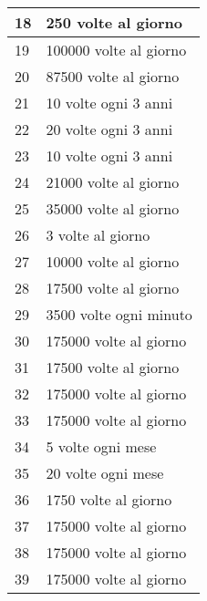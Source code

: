 \begin{table}[H]
{\begin{tabular}{ll}
\multicolumn{1}{|l|}{18} & \multicolumn{1}{l|}{250 volte al giorno}     \\ \hline
\multicolumn{1}{|l|}{19} & \multicolumn{1}{l|}{100000 volte al giorno}  \\ \hline
\multicolumn{1}{|l|}{20} & \multicolumn{1}{l|}{87500 volte al giorno}   \\ \hline
\multicolumn{1}{|l|}{21} & \multicolumn{1}{l|}{10 volte ogni 3 anni}    \\ \hline
\multicolumn{1}{|l|}{22} & \multicolumn{1}{l|}{20 volte ogni 3 anni}    \\ \hline
\multicolumn{1}{|l|}{23} & \multicolumn{1}{l|}{10 volte ogni 3 anni}    \\ \hline
\multicolumn{1}{|l|}{24} & \multicolumn{1}{l|}{21000 volte al giorno}   \\ \hline
\multicolumn{1}{|l|}{25} & \multicolumn{1}{l|}{35000 volte al giorno}   \\ \hline
\multicolumn{1}{|l|}{26} & \multicolumn{1}{l|}{3 volte al giorno}       \\ \hline
\multicolumn{1}{|l|}{27} & \multicolumn{1}{l|}{10000 volte al giorno}   \\ \hline
\multicolumn{1}{|l|}{28} & \multicolumn{1}{l|}{17500 volte al giorno}   \\ \hline
\multicolumn{1}{|l|}{29} & \multicolumn{1}{l|}{3500 volte ogni minuto}  \\ \hline
\multicolumn{1}{|l|}{30} & \multicolumn{1}{l|}{175000 volte al giorno}  \\ \hline
\multicolumn{1}{|l|}{31} & \multicolumn{1}{l|}{17500 volte al giorno}   \\ \hline
\multicolumn{1}{|l|}{32} & \multicolumn{1}{l|}{175000 volte al giorno}  \\ \hline
\multicolumn{1}{|l|}{33} & \multicolumn{1}{l|}{175000 volte al giorno}  \\ \hline
\multicolumn{1}{|l|}{34} & \multicolumn{1}{l|}{5 volte ogni mese}       \\ \hline
\multicolumn{1}{|l|}{35} & \multicolumn{1}{l|}{20 volte ogni mese}      \\ \hline
\multicolumn{1}{|l|}{36} & \multicolumn{1}{l|}{1750 volte al giorno}    \\ \hline
\multicolumn{1}{|l|}{37} & \multicolumn{1}{l|}{175000 volte al giorno}  \\ \hline
\multicolumn{1}{|l|}{38} & \multicolumn{1}{l|}{175000 volte al giorno}  \\ \hline
\multicolumn{1}{|l|}{39} & \multicolumn{1}{l|}{175000 volte al giorno}  \\ \hline

\end{tabular}}
\end{table}
